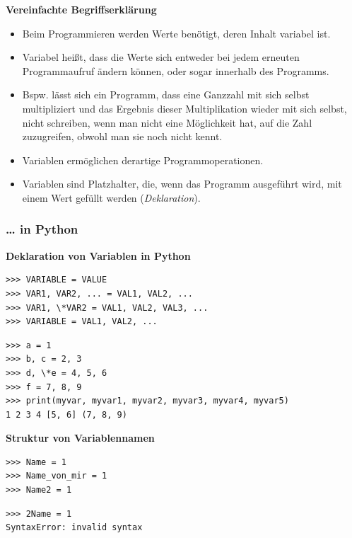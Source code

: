 \par\noindent\textbf{Vereinfachte Begriffserklärung}

\begin{itemize}
\itemsep1pt\parskip0pt
\item
  {Beim Programmieren werden Werte benötigt, deren Inhalt variabel ist.}
\item
  {Variabel heißt, dass die Werte sich entweder bei jedem erneuten
  Programmaufruf ändern können, oder sogar innerhalb des Programms.}
\item
  {Bspw. lässt sich ein Programm, dass eine Ganzzahl mit sich selbst
  multipliziert und das Ergebnis dieser Multiplikation wieder mit sich
  selbst, nicht schreiben, wenn man nicht eine Möglichkeit hat, auf die
  Zahl zuzugreifen, obwohl man sie noch nicht kennt.}
\item
  {Variablen ermöglichen derartige Programmoperationen.}
\item
  {Variablen sind Platzhalter, die, wenn das Programm ausgeführt wird,
  mit einem Wert gefüllt werden (\emph{Deklaration}).}
\end{itemize}


\subsubsection{\texorpdfstring{{\ldots{} in
Python}}{\ldots{} in Python}}

\par\noindent\textbf{Deklaration von Variablen in Python}

\begin{verbatim}
>>> VARIABLE = VALUE
>>> VAR1, VAR2, ... = VAL1, VAL2, ...
>>> VAR1, \*VAR2 = VAL1, VAL2, VAL3, ...
>>> VARIABLE = VAL1, VAL2, ...
\end{verbatim}

\begin{verbatim}
>>> a = 1
>>> b, c = 2, 3
>>> d, \*e = 4, 5, 6
>>> f = 7, 8, 9
>>> print(myvar, myvar1, myvar2, myvar3, myvar4, myvar5)
1 2 3 4 [5, 6] (7, 8, 9)
\end{verbatim}



\par\noindent\textbf{Struktur von Variablennamen}

\begin{verbatim}
>>> Name = 1
>>> Name_von_mir = 1
>>> Name2 = 1
\end{verbatim}

\begin{verbatim}
>>> 2Name = 1
SyntaxError: invalid syntax
\end{verbatim}




